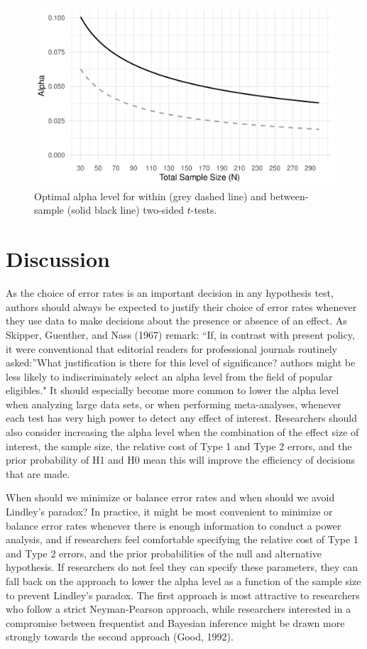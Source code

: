 \documentclass[
  english,
  ,man, a4paper,floatsintext]{apa6}
\begin{document}
\begin{figure}
\centering
\includegraphics{Justify_in_Practice_files/figure-latex/lindleyplot-1.pdf}
\caption{\label{fig:lindleyplot}Optimal alpha level for within (grey dashed line) and between-sample (solid black line) two-sided \(t\)-tests.}
\end{figure}

\hypertarget{discussion}{%
\section{Discussion}\label{discussion}}

As the choice of error rates is an important decision in any hypothesis test, authors should always be expected to justify their choice of error rates whenever they use data to make decisions about the presence or absence of an effect. As Skipper, Guenther, and Nass (1967) remark: ``If, in contrast with present policy, it were conventional that editorial readers for professional journals routinely asked:''What justification is there for this level of significance? authors might be less likely to indiscriminately select an alpha level from the field of popular eligibles." It should especially become more common to lower the alpha level when analyzing large data sets, or when performing meta-analyses, whenever each test has very high power to detect any effect of interest. Researchers should also consider increasing the alpha level when the combination of the effect size of interest, the sample size, the relative cost of Type 1 and Type 2 errors, and the prior probability of H1 and H0 mean this will improve the efficiency of decisions that are made.

When should we minimize or balance error rates and when should we avoid Lindley's paradox? In practice, it might be most convenient to minimize or balance error rates whenever there is enough information to conduct a power analysis, and if researchers feel comfortable specifying the relative cost of Type 1 and Type 2 errors, and the prior probabilities of the null and alternative hypothesis. If researchers do not feel they can specify these parameters, they can fall back on the approach to lower the alpha level as a function of the sample size to prevent Lindley's paradox. The first approach is most attractive to researchers who follow a strict Neyman-Pearson approach, while researchers interested in a compromise between frequentist and Bayesian inference might be drawn more strongly towards the second approach (Good, 1992).
\end{document}
